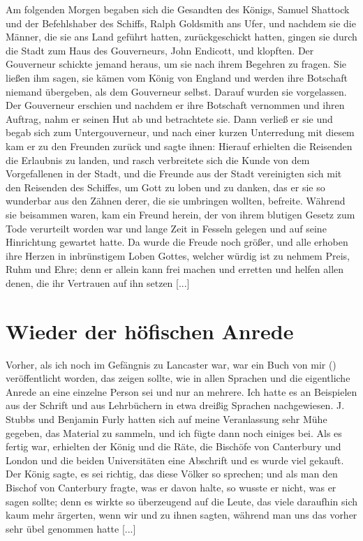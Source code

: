 Am folgenden Morgen begaben sich die Gesandten des Königs, 
Samuel Shattock und der Befehlshaber des Schiffs, Ralph 
Goldsmith ans Ufer, und nachdem sie die Männer, die sie ans 
Land geführt hatten, zurückgeschickt hatten,
gingen sie durch die Stadt zum Haus des Gouverneurs, John
Endicott, 
und klopften. Der Gouverneur schickte jemand heraus,
um sie nach ihrem Begehren zu fragen. Sie ließen ihm sagen,
sie kämen vom König von England und werden ihre Botschaft
niemand übergeben, als dem Gouverneur selbst. Darauf wurden
sie vorgelassen. Der Gouverneur erschien und nachdem er ihre
Botschaft vernommen und ihren Auftrag, nahm er seinen Hut ab
und betrachtete sie. Dann verließ er sie und begab sich zum
Untergouverneur, und nach einer kurzen Unterredung mit diesem
kam er zu den Freunden zurück und sagte ihnen:  Hierauf erhielten
die Reisenden die Erlaubnis zu landen, und rasch verbreitete sich
die Kunde von dem Vorgefallenen in der Stadt, und die Freunde
aus der Stadt vereinigten sich mit den Reisenden des Schiffes,
um Gott zu loben und zu danken, das er sie so wunderbar aus
den Zähnen derer, die sie umbringen wollten, befreite. Während
sie beisammen waren, kam ein Freund herein, der von ihrem
blutigen Gesetz zum Tode verurteilt worden war und lange Zeit
in Fesseln gelegen und auf seine Hinrichtung gewartet hatte. Da
wurde die Freude noch größer, und alle erhoben ihre Herzen in
inbrünstigem Loben Gottes, welcher würdig ist zu nehmem Preis,
Ruhm und Ehre; denn er allein kann frei machen und erretten
und helfen allen denen, die ihr Vertrauen auf ihn setzen [...]

\section{Wieder der höfischen Anrede}  

Vorher, als ich noch im Gefängnis zu Lancaster war, war
ein Buch von mir () veröffentlicht 
worden, das zeigen sollte, wie in allen Sprachen  
und  die eigentliche Anrede an eine einzelne 
Person sei und  nur an mehrere.
Ich hatte es an Beispielen aus der Schrift und aus Lehrbüchern
in etwa dreißig Sprachen nachgewiesen. J. 
Stubbs und Benjamin 
Furly hatten sich auf meine 
Veranlassung sehr Mühe gegeben,
das Material zu sammeln, und ich fügte dann noch einiges bei.
Als es fertig war, erhielten der König und die Räte, die Bischöfe
von Canterbury und London und die beiden Universitäten eine
Abschrift und es wurde viel gekauft. Der König sagte, es sei
richtig, das diese Völker so sprechen; und als man den Bischof
von Canterbury fragte, was er davon halte, so wusste er nicht,
was er sagen sollte; denn es wirkte so überzeugend auf die Leute,
das viele daraufhin sich kaum mehr ärgerten, wenn wir 
und  zu ihnen sagten, während man uns das vorher sehr
übel genommen hatte [...]

